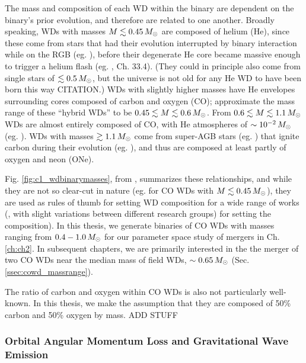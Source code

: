 The mass and composition of each WD within the binary are dependent on the binary's prior evolution, and therefore are related to one another.  Broadly speaking, WDs with masses $M \lesssim 0.45\,\Msun$ are composed of helium (He), since these come from stars that had their evolution interrupted by binary interaction while on the RGB (eg. \citealt{marsdd95, nele+01, nele+01a}), before their degenerate He core became massive enough to trigger a helium flash (eg. \cite{kippww12}, Ch. 33.4).  (They could in principle also come from single stars of $\lesssim0.5\,\Msun$, but the universe is not old for any He WD to have been born this way {\charles CITATION}.)  WDs with slightly higher masses have He envelopes surrounding cores composed of carbon and oxygen (CO); \cite{dan+12} approximate the mass range of these ``hybrid WDs'' to be $0.45 \lesssim M \lesssim 0.6\,\Msun$.  From $0.6 \lesssim M \lesssim 1.1\,\Msun$ WDs are almost entirely composed of CO, with He atmospheres of $\sim10^{-2}\,\Msun$ (eg. \citealt{ibent85}).  WDs with masses $\gtrsim 1.1\,\Msun$ come from super-AGB stars (eg. \citealt{herw05}) that ignite carbon during their evolution (eg. \citealt{garc13}), and thus are composed at least partly of oxygen and neon (ONe).  

Fig. \ref{fig:c1_wdbinarymasses}, from \cite{dan+12}, summarizes these relationships, and while they are not so clear-cut in nature (eg. \citealt{ibent85, moros09} for CO WDs with $M\lesssim0.45\,\Msun$), they are used as rules of thumb for setting WD composition for a wide range of works (\citealt{loreig09,rask+12,dan+12,dan+14,}, with slight variations between different research groups) for setting the composition).  In this thesis, we generate binaries of CO WDs with masses ranging from $0.4 - 1.0\,\Msun$ for our parameter space study of mergers in Ch. \ref{ch:ch2}.  In subsequent chapters, we are primarily interested in the the merger of two CO WDs near the median mass of field WDs, $\sim0.65\,\Msun$ (Sec. \ref{ssec:cowd_massrange}).

The ratio of carbon and oxygen within CO WDs is also not particularly well-known.  In this thesis, we make the assumption that they are composed of 50\% carbon and 50\% oxygen by mass.  {\charles ADD STUFF}

\subsubsection{Orbital Angular Momentum Loss and Gravitational Wave Emission}

